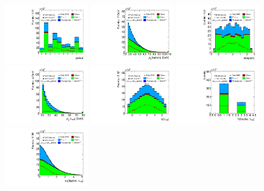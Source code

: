 \begin{figure}[tp]
  \centering
  \includegraphics[width=0.32\textwidth]{figures/presel/period}
  \includegraphics[width=0.32\textwidth]{figures/presel/lep-pt-hi}
  \includegraphics[width=0.32\textwidth]{figures/presel/lep-eta}
  \includegraphics[width=0.32\textwidth]{figures/presel/tau-pt}
  \includegraphics[width=0.32\textwidth]{figures/presel/tau-eta}
  \includegraphics[width=0.32\textwidth]{figures/presel/tau-numTrack}
  \includegraphics[width=0.32\textwidth]{figures/presel/taulep-deta}

\end{figure}

